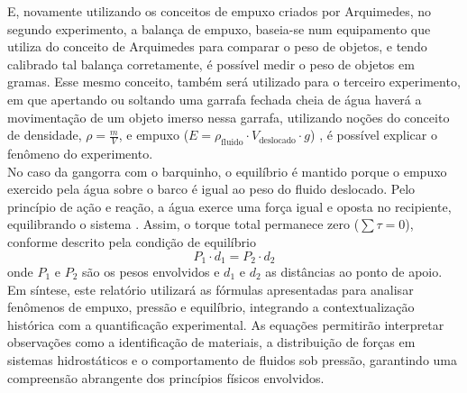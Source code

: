 E, novamente utilizando os conceitos de empuxo criados por Arquimedes, no
segundo experimento, a balança de empuxo, baseia-se num equipamento que utiliza
do conceito de Arquimedes para comparar o peso de objetos, e tendo calibrado tal
balança corretamente, é possível medir o peso de objetos em gramas. Esse mesmo
conceito, também será utilizado para o terceiro experimento, em que apertando ou
soltando uma garrafa fechada cheia de água haverá a movimentação de um objeto
imerso nessa garrafa, utilizando noções do conceito de densidade, $\rho =
\frac{m}{V}$, e empuxo ($E = \rho_{\text{fluido}} \cdot V_{\text{deslocado}}
\cdot g$) \cite{nussenzveig2014}, é possível explicar o fenômeno do
experimento.\\

No caso da gangorra com o barquinho, o equilíbrio é mantido porque o empuxo
exercido pela água sobre o barco é igual ao peso do fluido deslocado. Pelo
princípio de ação e reação, a água exerce uma força igual e oposta no
recipiente, equilibrando o sistema \cite{nussenzveig2014}. Assim, o torque total
permanece zero ($\sum \tau = 0$), conforme descrito pela condição de equilíbrio
\begin{equation}
	P_1 \cdot d_1 = P_2 \cdot d_2 \label{eq:equilibrio}
\end{equation}
onde $P_1$ e $P_2$ são os pesos envolvidos e $d_1$ e $d_2$ as distâncias ao
ponto de apoio.\\

Em síntese, este relatório utilizará as fórmulas apresentadas para analisar
fenômenos de empuxo, pressão e equilíbrio, integrando a contextualização
histórica com a quantificação experimental. As equações permitirão interpretar
observações como a identificação de materiais, a distribuição de forças em
sistemas hidrostáticos e o comportamento de fluidos sob pressão, garantindo uma
compreensão abrangente dos princípios físicos envolvidos.\\

